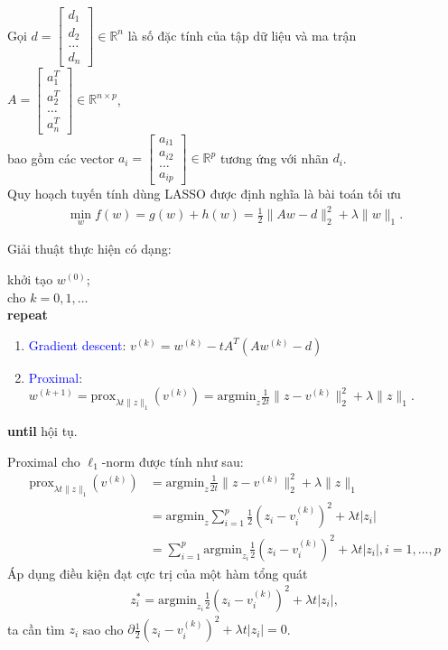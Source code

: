\documentclass{book}
\begin{document}
Gọi $d = \begin{bmatrix}
d_1 \\ d_2 \\ \ldots \\ d_n
\end{bmatrix} \in \mathbb{R}^n$ là số đặc tính của tập dữ liệu và ma trận $A = \begin{bmatrix}
a_1^T \\ a_2^T \\ \ldots \\ a_n^T
\end{bmatrix} \in \mathbb{R}^{n \times p}$, \\
bao gồm các vector $a_i = \begin{bmatrix}
a_{i1} \\ a_{i2} \\ \ldots \\ a_{ip}
\end{bmatrix} \in \mathbb{R}^p$ tương ứng với nhãn $d_i$.\\

Quy hoạch tuyến tính dùng LASSO được định nghĩa là bài toán tối ưu
\begin{align*}
\min_w f(w) = g(w) + h(w) = \frac{1}{2} \| Aw - d \|_2^2 + \lambda \|w\|_1.
\end{align*}

Giải thuật thực hiện có dạng:
\begin{algorithm}[H]
khởi tạo $w^{(0)}$;\\
cho $k = 0,1,\ldots$\\
\textbf{repeat} 
\begin{enumerate}
\item \textcolor{blue}{Gradient descent}: $v^{(k)} =  w^{(k)} - t A^T (A w^{(k)} - d)$
\item \textcolor{blue}{Proximal}: $w^{(k + 1)} = \textrm{prox}_{\lambda t \|z\|_1}(v^{(k)}) =  \textrm{argmin}_z \frac{1}{2t} \| z - v^{(k)} \|_2^2 + \lambda \|z\|_1$.
\end{enumerate}
\textbf{until} hội tụ. 
\caption{Giải thuật Iterative Shrinkage-Thresholding Algorithm (ISTA) cho LASSO.}
\label{alg:ISTA}
\end{algorithm}

Proximal cho $\ell_1$-norm được tính như sau: 
\begin{align*}
\textrm{prox}_{\lambda t \|z\|_1}(v^{(k)}) &=  \textrm{argmin}_z \frac{1}{2t} \| z - v^{(k)} \|_2^2 + \lambda \|z\|_1 \\
&  = \textrm{argmin}_{z} \sum_{i = 1}^p \frac{1}{2}(z_i - v_i^{(k)})^2 + \lambda t |z_i| \\
&  = \sum_{i = 1}^p \textrm{argmin}_{z_i} \frac{1}{2} (z_i - v_i^{(k)})^2 + \lambda t |z_i|,  i = 1, \ldots, p
\end{align*}
Áp dụng điều kiện đạt cực trị của một hàm tổng quát
\begin{align*}
z_i^* = \textrm{argmin}_{z_i} \frac{1}{2}(z_i - v_i^{(k)})^2 + \lambda t |z_i|,
\end{align*}
ta cần tìm $z_i$ sao cho $\partial \frac{1}{2}(z_i - v_i^{(k)})^2 + \lambda t |z_i| = 0$.
\end{document}
